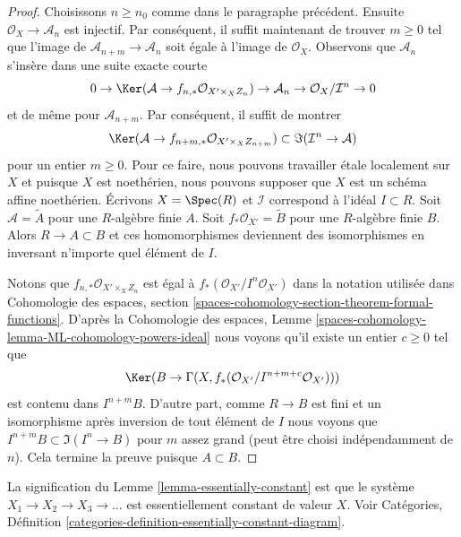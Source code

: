 \begin{proof}
\medskip\noindent
Choisissons $n \geq n_0$ comme dans le paragraphe précédent. Ensuite
$\mathcal{O}_X \to \mathcal{A}_n$ est injectif. Par conséquent, il suffit maintenant de trouver $m \geq 0$ tel que l'image de
$\mathcal{A}_{n + m} \to \mathcal{A}_n$ soit égale à l'image de $\mathcal{O}_X$. Observons que $\mathcal{A}_n$
s'insère dans une suite exacte courte
$$
0 \to \Ker(\mathcal{A} \to f_{n, *}\mathcal{O}_{X' \times_X Z_n})
\to \mathcal{A}_n \to \mathcal{O}_X/\mathcal{I}^n \to 0
$$
et de même pour $\mathcal{A}_{n + m}$. Par conséquent, il suffit de montrer
$$
\Ker(\mathcal{A} \to f_{n + m, *}\mathcal{O}_{X' \times_X Z_{n + m}})
\subset
\Im(\mathcal{I}^n \to \mathcal{A})
$$
pour un entier $m \geq 0$. Pour ce faire, nous pouvons travailler \'etale localement sur
$X$ et puisque $X$ est noethérien, nous pouvons supposer que $X$ est
un schéma affine noethérien. Écrivons $X = \Spec(R)$ et $\mathcal{I}$
correspond à l'idéal $I \subset R$. Soit $\mathcal{A} = \widetilde{A}$
pour une $R$-algèbre finie $A$. Soit $f_*\mathcal{O}_{X'} = \widetilde{B}$
pour une $R$-algèbre finie $B$. Alors $R \to A \subset B$ et ces homomorphismes deviennent des isomorphismes en inversant n'importe quel élément de $I$.

\medskip\noindent
Notons que $f_{n, *}\mathcal{O}_{X' \times_X Z_n}$
est égal à $f_*(\mathcal{O}_{X'}/I^n\mathcal{O}_{X'})$
dans la notation utilisée dans Cohomologie des espaces, section
\ref{spaces-cohomology-section-theorem-formal-functions}.
D'après la Cohomologie des espaces, Lemme
\ref{spaces-cohomology-lemma-ML-cohomology-powers-ideal}
nous voyons qu'il existe un entier $c \geq 0$ tel que
$$
\Ker(B \to \Gamma(X, f_*(\mathcal{O}_{X'}/I^{n + m + c}\mathcal{O}_{X'})))
$$
est contenu dans $I^{n + m}B$. D'autre part, comme $R \to B$ est
fini et un isomorphisme après inversion de tout élément de $I$
nous voyons que $I^{n + m}B \subset \Im(I^n \to B)$ pour $m$ assez grand
(peut être choisi indépendamment de $n$). Cela termine la preuve puisque $A \subset B$.
\end{proof}

\begin{remark}
\label{remark-essentially-constant}
La signification du Lemme \ref{lemma-essentially-constant}
est que le système $X_1 \to X_2 \to X_3 \to \ldots$ est essentiellement
constant de valeur $X$. Voir Catégories, Définition
\ref{categories-definition-essentially-constant-diagram}.
\end{remark}






